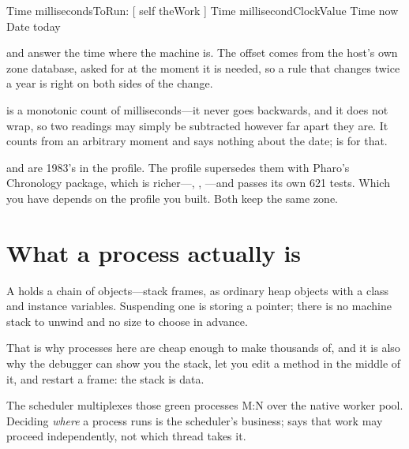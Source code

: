 \begin{st}
Time millisecondsToRun: [ self theWork ]
Time millisecondClockValue
Time now
Date today
\end{st}

 and  answer the time where the machine is. The
offset comes from the host's own zone database, asked for at the moment it
is needed, so a rule that changes twice a year is right on both sides of the
change.

 is a monotonic count of milliseconds---it
never goes backwards, and it does not wrap, so two readings may simply be
subtracted however far apart they are. It counts from an arbitrary moment
and says nothing about the date;  is for that.

\begin{stwarn}
 and  are 1983's in the  profile. The
 profile supersedes them with Pharo's Chronology package,
which is richer---, , ---and
passes its own 621 tests. Which you have depends on the profile you built.
Both keep the same zone.
\end{stwarn}

\section{What a process actually is}

A  holds a chain of  objects---stack frames, as
ordinary heap objects with a class and instance variables. Suspending one is
storing a pointer; there is no machine stack to unwind and no size to choose
in advance.

That is why processes here are cheap enough to make thousands of, and it is
also why the debugger can show you the stack, let you edit a method in the
middle of it, and restart a frame: the stack is data.

The scheduler multiplexes those green processes M:N over the native worker
pool. Deciding \emph{where} a process runs is the scheduler's business;
 says that work may proceed independently, not which thread
takes it.
